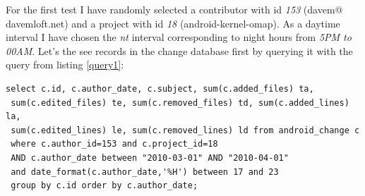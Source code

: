 \documentclass[a4paper,10pt]{article}
\numberwithin{equation}{subsection}
\begin{document}
For the first test I have randomly selected a contributor with id \emph{153} (davem$@$davemloft.net) and a project with id 
\emph{18} (android-kernel-omap). 
As a daytime interval I have chosen the \emph{nt} interval corresponding to night hours from \emph{5PM to 00AM}. 
Let's the see records in the change database first by querying it with the query from listing \ref{query1}:

\noindent\begin{minipage}{\textwidth}
\begin{lstlisting}[label=query1,caption=Data summary retrieval SQL query]
select c.id, c.author_date, c.subject, sum(c.added_files) ta, 
 sum(c.edited_files) te, sum(c.removed_files) td, sum(c.added_lines) la, 
 sum(c.edited_lines) le, sum(c.removed_lines) ld from android_change c 
 where c.author_id=153 and c.project_id=18 
 AND c.author_date between "2010-03-01" AND "2010-04-01"
 and date_format(c.author_date,'%H') between 17 and 23
 group by c.id order by c.author_date;
\end{lstlisting}
\end{minipage}
\end{document}
